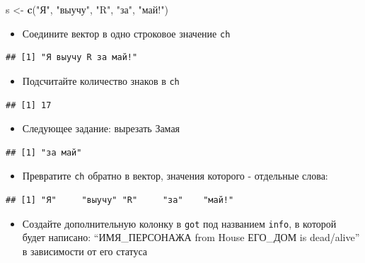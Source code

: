 \documentclass[]{book}
\newenvironment{Shaded}{\begin{snugshade}}{\end{snugshade}}
\newcommand{\KeywordTok}[1]{\textcolor[rgb]{0.13,0.29,0.53}{\textbf{#1}}}
\newcommand{\StringTok}[1]{\textcolor[rgb]{0.31,0.60,0.02}{#1}}
\newcommand{\NormalTok}[1]{#1}
\providecommand{\tightlist}{%
  \setlength{\itemsep}{0pt}\setlength{\parskip}{0pt}}
\begin{document}
\begin{Shaded}
\begin{Highlighting}[]
\NormalTok{s <-}\StringTok{ }\KeywordTok{c}\NormalTok{(}\StringTok{"Я"}\NormalTok{, }\StringTok{"выучу"}\NormalTok{, }\StringTok{"R"}\NormalTok{, }\StringTok{"за"}\NormalTok{, }\StringTok{"май!"}\NormalTok{)}
\end{Highlighting}
\end{Shaded}

\begin{itemize}
\tightlist
\item
  Соедините вектор в одно строковое значение \texttt{ch}
\end{itemize}

\begin{verbatim}
## [1] "Я выучу R за май!"
\end{verbatim}

\begin{itemize}
\tightlist
\item
  Подсчитайте количество знаков в \texttt{ch}
\end{itemize}

\begin{verbatim}
## [1] 17
\end{verbatim}

\begin{itemize}
\tightlist
\item
  Следующее задание: вырезать Замая
\end{itemize}

\begin{verbatim}
## [1] "за май"
\end{verbatim}

\begin{itemize}
\tightlist
\item
  Превратите \texttt{ch} обратно в вектор, значения которого - отдельные
  слова:
\end{itemize}

\begin{verbatim}
## [1] "Я"     "выучу" "R"     "за"    "май!"
\end{verbatim}

\begin{itemize}
\tightlist
\item
  Создайте дополнительную колонку в \texttt{got} под названием
  \texttt{info}, в которой будет написано: ``ИМЯ\_ПЕРСОНАЖА from House
  ЕГО\_ДОМ is dead/alive'' в зависимости от его статуса
\end{itemize}
\end{document}
